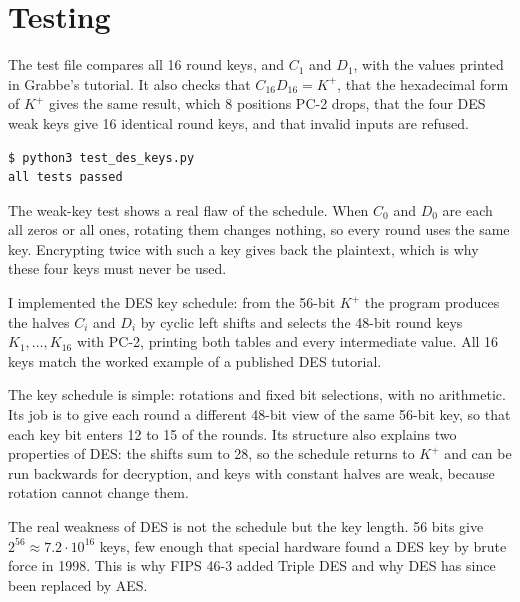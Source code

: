\documentclass[11pt,a4paper]{article}
\begin{document}
\section{Testing}\label{sec:tests}

The test file compares all 16 round keys, and $C_1$ and $D_1$, with the values printed in Grabbe's
tutorial. It also checks that $C_{16}D_{16} = K^+$, that the hexadecimal form of $K^+$ gives the
same result, which 8 positions PC-2 drops, that the four DES weak keys give 16 identical round keys,
and that invalid inputs are refused.



\begin{lstlisting}[caption={Running the tests},label={fig:testrun}]
$ python3 test_des_keys.py
all tests passed
\end{lstlisting}

The weak-key test shows a real flaw of the schedule. When $C_0$ and $D_0$ are each all zeros or all
ones, rotating them changes nothing, so every round uses the same key. Encrypting twice with such
a key gives back the plaintext, which is why these four keys must never be used.


I implemented the DES key schedule: from the 56-bit $K^+$ the program produces the halves
$C_i$ and $D_i$ by cyclic left shifts and selects the 48-bit round keys $K_1, \dots, K_{16}$ with
PC-2, printing both tables and every intermediate value. All 16 keys match the worked example of a
published DES tutorial.

The key schedule is simple: rotations and fixed bit selections, with no arithmetic. Its job is to
give each round a different 48-bit view of the same 56-bit key, so that each key bit enters 12 to 15
of the rounds. Its structure also explains two properties of DES: the shifts sum to 28, so the
schedule returns to $K^+$ and can be run backwards for decryption, and keys with constant halves
are weak, because rotation cannot change them.

The real weakness of DES is not the schedule but the key length. 56 bits give $2^{56} \approx 7.2
\cdot 10^{16}$ keys, few enough that special hardware found a DES key by brute force in 1998. This
is why FIPS 46-3 added Triple DES and why DES has since been replaced by AES.
\end{document}
